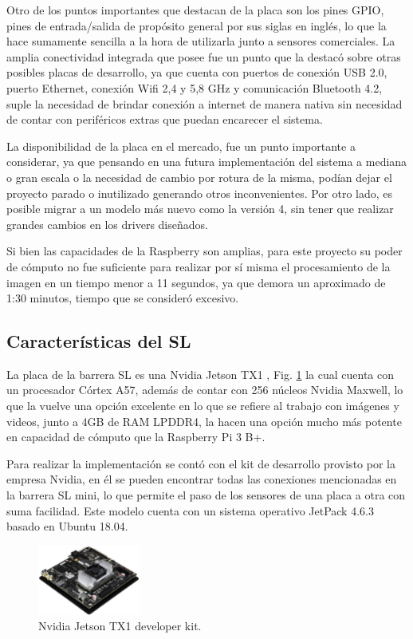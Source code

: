 Otro de los puntos importantes que destacan de la placa son los pines GPIO, pines de entrada/salida de propósito general por sus siglas en inglés, lo que la hace sumamente sencilla a la hora de utilizarla junto a sensores comerciales.
La amplia conectividad integrada que posee fue un punto que la destacó sobre otras posibles placas de desarrollo, ya que cuenta con puertos de conexión USB 2.0, puerto Ethernet, conexión Wifi 2,4 y 5,8 GHz y comunicación Bluetooth 4.2, suple la necesidad de brindar conexión a internet de manera nativa sin necesidad de contar con periféricos extras que puedan encarecer el sistema.

La disponibilidad de la placa en el mercado, fue un punto importante a considerar, ya que pensando en una futura
implementación del sistema a mediana o gran escala o la necesidad de cambio por rotura de la misma, podían dejar el
proyecto parado o inutilizado generando otros inconvenientes. Por otro lado, es posible migrar a un modelo más nuevo como la versión 4, sin tener que realizar grandes cambios en los drivers diseñados.

Si bien las capacidades de la Raspberry son amplias, para este proyecto su poder de cómputo no fue suficiente para realizar por sí misma el procesamiento de la imagen en un tiempo menor a 11 segundos, ya que demora un aproximado de 1:30 minutos, tiempo que se consideró excesivo.

\subsection{Características del SL}

La placa de la barrera SL es una Nvidia Jetson TX1 \cite{nvidia_manual_nodate}, Fig. \ref{fig:JTX1} la cual cuenta con un procesador Córtex A57, además de contar con 256 núcleos Nvidia Maxwell, lo que la vuelve una opción excelente en lo que se refiere al trabajo con imágenes y videos, junto a 4GB de RAM LPDDR4, la hacen una opción mucho más potente en capacidad de cómputo que la Raspberry Pi 3 B+.

Para realizar la implementación se contó con el kit de desarrollo provisto por la empresa Nvidia, en él se pueden encontrar todas las conexiones mencionadas en la barrera SL mini, lo que permite el paso de los sensores de una placa a otra con suma facilidad.
Este modelo cuenta con un sistema operativo JetPack 4.6.3 basado en Ubuntu 18.04.

\begin{figure}
    \centering
    \includegraphics[width=0.3\textwidth]{imgs/JTX1-developerkit.png}
    \caption{Nvidia Jetson TX1 developer kit.}
    \label{fig:JTX1}
\end{figure}



